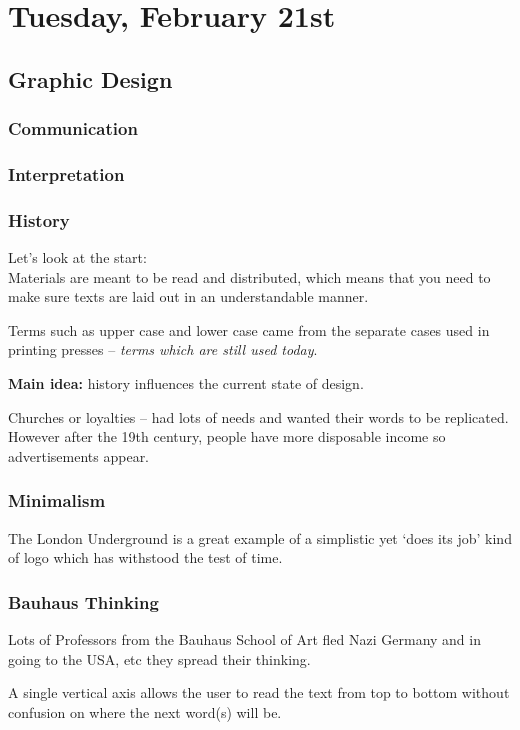 \section{Tuesday, February 21st}
\subsection{Graphic Design}
\subsubsection{Communication}
\subsubsection{Interpretation}
\subsubsection{History}
Let's look at the start:\\
Materials are meant to be read and distributed, which means that you need to make sure texts are laid out in an understandable manner.

Terms such as upper case and lower case came from the separate cases used in printing presses -- \textit{terms which are still used today}.

\textbf{Main idea:} history influences the current state of design.

Churches or loyalties -- had lots of needs and wanted their words to be replicated. However after the 19th century, people have more disposable income so advertisements appear.

\subsubsection{Minimalism}
The London Underground is a great example of a simplistic yet `does its job' kind of logo which has withstood the test of time.

\subsubsection{Bauhaus Thinking}
Lots of Professors from the Bauhaus School of Art fled Nazi Germany and in going to the USA, etc they spread their thinking.

A single vertical axis allows the user to read the text from top to bottom without confusion on where the next word(s) will be.

